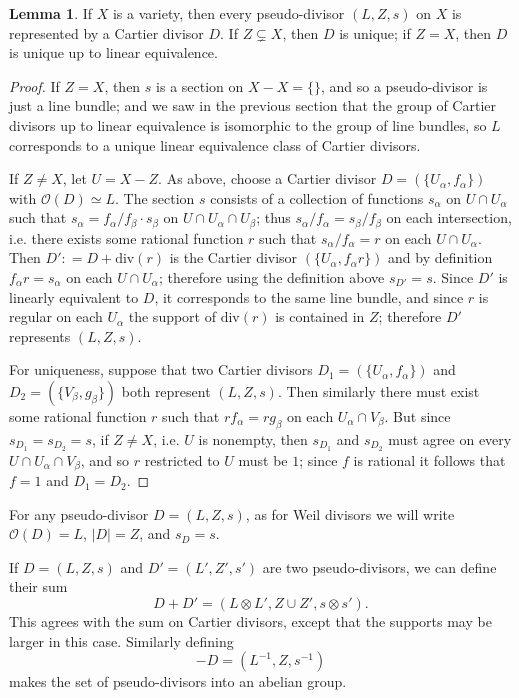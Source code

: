 \documentclass[12pt]{article}
\theoremstyle{definition}
\theoremstyle{theorem}
\newtheorem{lem}[defn]{Lemma}
\renewcommand{\O}{\mathcal O}
\newcommand{\tensor}{\otimes}
\newcommand{\1}{\mathbbm 1}
\renewcommand{\div}{\text{div}}
\begin{document}
\begin{lem}
If $X$ is a variety, then every pseudo-divisor $(L,Z,s)$ on $X$ is represented by a Cartier divisor $D$. If $Z \subsetneq X$, then $D$ is unique; if $Z = X$, then $D$ is unique up to linear equivalence.
\end{lem}
\begin{proof}
If $Z = X$, then $s$ is a section on $X - X = \{\}$, and so a pseudo-divisor is just a line bundle; and we saw in the previous section that the group of Cartier divisors up to linear equivalence is isomorphic to the group of line bundles, so $L$ corresponds to a unique linear equivalence class of Cartier divisors.

If $Z \neq X$, let $U = X - Z$. As above, choose a Cartier divisor $D = (\{U_\alpha, f_\alpha\})$ with $\O(D) \simeq L$. The section $s$ consists of a collection of functions $s_\alpha$ on $U \cap U_\alpha$ such that $s_\alpha = f_\alpha/f_\beta \cdot s_\beta$ on $U \cap U_\alpha \cap U_\beta$; thus $s_\alpha/f_\alpha = s_\beta/f_\beta$ on each intersection, i.e. there exists some rational function $r$ such that $s_\alpha / f_\alpha = r$ on each $U \cap U_\alpha$. Then $D' : = D + \div(r)$ is the Cartier divisor $(\{U_\alpha, f_\alpha r\})$ and by definition $f_\alpha r = s_\alpha$ on each $U \cap U_\alpha$; therefore using the definition above $s_{D'} = s$. Since $D'$ is linearly equivalent to $D$, it corresponds to the same line bundle, and since $r$ is regular on each $U_\alpha$ the support of $\div(r)$ is contained in $Z$; therefore $D'$ represents $(L,Z,s)$.

For uniqueness, suppose that two Cartier divisors $D_1 = (\{U_\alpha, f_\alpha\})$ and $D_2 = (\{V_\beta, g_\beta\})$ both represent $(L,Z,s)$. Then similarly there must exist some rational function $r$ such that $r f_\alpha = r g_\beta$ on each $U_\alpha \cap V_\beta$. But since $s_{D_1} = s_{D_2} = s$, if $Z \neq X$, i.e. $U$ is nonempty, then $s_{D_1}$ and $s_{D_2}$ must agree on every $U \cap U_\alpha \cap V_\beta$, and so $r$ restricted to $U$ must be $1$; since $f$ is rational it follows that $f = 1$ and $D_1 = D_2$.
\end{proof}

For any pseudo-divisor $D = (L,Z,s)$, as for Weil divisors we will write $\O(D) = L$, $|D| = Z$, and $s_D = s$.

If $D = (L,Z,s)$ and $D' = (L', Z', s')$ are two pseudo-divisors, we can define their sum \[ D + D' = (L \tensor L', Z \cup Z', s \tensor s') . \] This agrees with the sum on Cartier divisors, except that the supports may be larger in this case. Similarly defining \[ -D = (L^{-1}, Z, s^{-1}) \] makes the set of pseudo-divisors into an abelian group.
\end{document}
